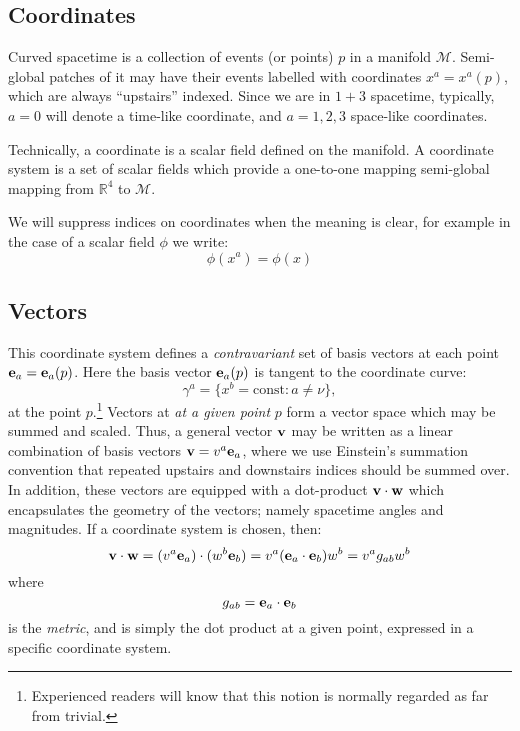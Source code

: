 \subsection{Coordinates}
Curved spacetime is a collection of events (or points) $p$ in a manifold $\mathcal{M}$. Semi-global patches of it may have their events labelled with coordinates $x^a = x^a(p)$, which are always ``upstairs'' indexed. Since we are in $1+3$ spacetime, typically, $a=0$ will denote a time-like coordinate, and $a=1,2,3$ space-like coordinates.

Technically, a coordinate is a scalar field defined on the manifold. A coordinate system is a set of scalar fields which provide a one-to-one mapping semi-global mapping from $\mathbb{R}^4$ to $\mathcal{M}$.

We will suppress indices on coordinates when the meaning is clear, for example in the case of a scalar field $\phi$ we write:
\begin{equation}
  \phi(x^a) = \phi(x)
  \label{eqn:cos:scalar_supress}
\end{equation}



\subsection{Vectors}
This coordinate system defines a {\em contravariant\/} set of basis vectors at each point $\mathbf{e}_a = \mathbf{e}_a(p)$. Here the basis vector $\mathbf{e}_a(p)$ is tangent to the coordinate curve:
\begin{equation}
  \gamma^a = \{x^b=\mathrm{const} : a\ne \nu\},
  \label{eqn:cos:coordinate_curve}
\end{equation}
at the point $p$.\footnote{Experienced readers will know that this notion is normally regarded as far from trivial.}
  Vectors at {\em at a given point\/} $p$ form a vector space which may be summed and scaled. Thus, a general vector $\mathbf{v}$ may be written as a linear combination of basis vectors $\mathbf{v} = v^a \mathbf{e}_a$, where we use Einstein's summation convention that repeated upstairs and downstairs indices should be summed over. In addition, these vectors are equipped with a dot-product $\mathbf{v}\cdot\mathbf{w}$ which encapsulates the geometry of the vectors; namely spacetime angles and magnitudes. If a coordinate system is chosen, then:
\begin{equation}
  \mathbf{v}\cdot\mathbf{w} = (v^a\mathbf{e}_a)\cdot(w^b\mathbf{e}_b) = v^a (\mathbf{e}_a\cdot\mathbf{e}_b)w^b =  v^a g_{ab} w^b
  \label{eqn:cos:dot_product}
\end{equation}
where 
\begin{equation}
  g_{ab} = \mathbf{e}_a\cdot\mathbf{e}_b
  \label{eqn:cos:metric_def}
\end{equation}
is the {\em metric}, and is simply the dot product at a given point, expressed in a specific coordinate system.

